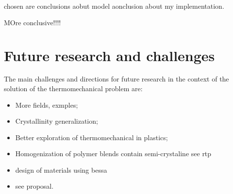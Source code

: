 chosen are
conclusions aobut model
aonclusion about my implementation.

MOre conclusive!!!!


\section{Future research and challenges}

The main challenges and directions for future research in the context of the solution of the thermomechanical problem are:
\begin{itemize}
  \item More fields, exmples;
  \item Crystallinity generalization;
  \item Better exploration of thermomechanical in plastics;
  \item Homogenization of polymer blends contain semi-crystaline see rtp
  \item design of materials using bessa
  \item see proposal.
\end{itemize}
